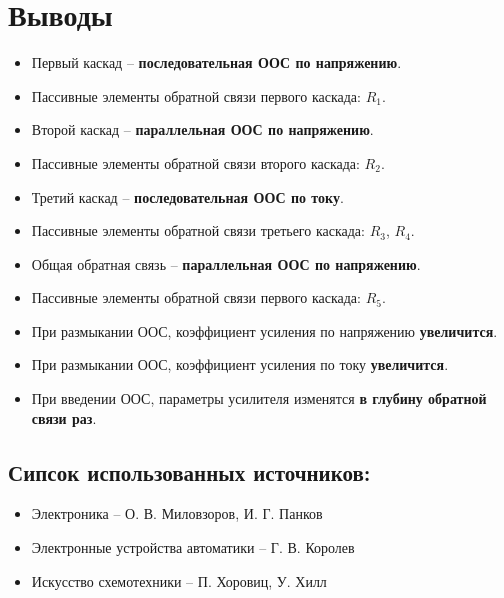 \documentclass{labreport}
\begin{document}
\chapter{Выводы}
\begin{itemize}
  \item   Первый каскад -- \textbf{последовательная ООС по напряжению}.

\item  Пассивные элементы обратной связи первого каскада: $R_1$.

\item Второй каскад -- \textbf{параллельная ООС по напряжению}.

\item Пассивные элементы обратной связи второго каскада: $R_2$.

\item Третий каскад -- \textbf{последовательная ООС по току}.

\item Пассивные элементы обратной связи третьего каскада: $R_3$, $R_4$.

\item Общая обратная связь -- \textbf{параллельная ООС по напряжению}.

\item Пассивные элементы обратной связи первого каскада: $R_5$.

\item При размыкании ООС, коэффициент усиления по напряжению \textbf{увеличится}.

\item При размыкании ООС, коэффициент усиления по току \textbf{увеличится}.

\item При введении ООС, параметры усилителя изменятся \textbf{в глубину обратной связи раз}. 
\end{itemize}

\section{Сипсок использованных источников:}

\begin{itemize}
    \item Электроника -- О. В. Миловзоров, И. Г. Панков
    \item Электронные устройства автоматики -- Г. В. Королев
    \item Искусство схемотехники -- П. Хоровиц, У. Хилл
\end{itemize}
    
\end{document}
